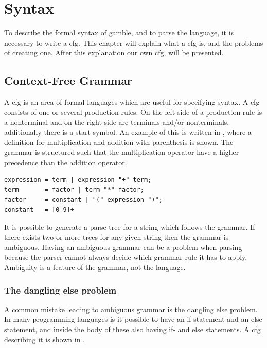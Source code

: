 \chapter{Syntax}\label{chap:syntax}

To describe the formal syntax of \gls{gamble}, and to parse the language, it is necessary to write a \acrfull{cfg}.
This chapter will explain what a \acrfull{cfg} is, and the problems of creating one.
After this explanation our own \acrfull{cfg}, will be presented.

\section{Context-Free Grammar}
A \acrshort{cfg} is an area of formal languages which are useful for specifying syntax. 
A \acrshort{cfg} consists of one or several production rules.
On the left side of a production rule is a nonterminal and on the right side are terminals and/or nonterminals, additionally there is a start symbol.
An example of this is written in , where a definition for multiplication and addition with parenthesis is shown.
The grammar is structured such that the multiplication operator have a higher precedence than the addition operator.

\begin{lstlisting}[caption={An example of a \acrshort{cfg} written in \acrshort{ebnf}, with \acrshort{regex} for defining numbers. },frame=tlrb,label={lst:cfglst1},numbers=none]
expression = term | expression "+" term;
term       = factor | term "*" factor;
factor     = constant | "(" expression ")";
constant   = [0-9]+
\end{lstlisting}

It is possible to generate a parse tree for a string which follows the grammar. 
If there exists two or more trees for any given string then the grammar is ambiguous. 
Having an ambiguous grammar can be a problem when parsing because the parser cannot always decide which grammar rule it has to apply.
Ambiguity is a feature of the grammar, not the language. 

\subsection{The dangling else problem}

A common mistake leading to ambiguous grammar is the dangling else problem. \citep{danglingelse}
In many programming languages is it possible to have an if statement and an else statement, and inside the body of these also having if- and else statements. 
A \acrshort{cfg} describing it is shown in .

